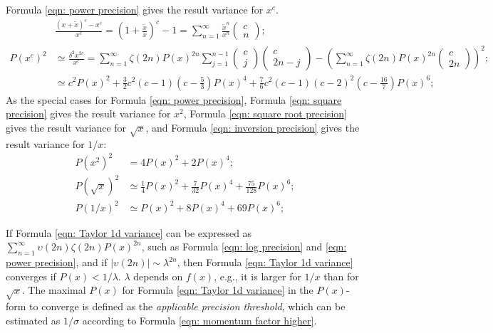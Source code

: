 \documentclass[twoside]{article}
\numberwithin{equation}{section}
\begin{document}
Formula \eqref{eqn: power precision} gives the result variance for $x^c$.
\begin{align}
\label{eqn: power Taylor}
&\frac{(x + \tilde{x})^c - x^c}{x^c} = (1 + \frac{\tilde{x}}{x})^c - 1 = \sum_{n=1}^{\infty} \frac{\tilde{x}^n}{x^n} \begin{pmatrix} c \\ n \end{pmatrix}; \\
\label{eqn: power precision}
P(x^c)^2 &\simeq \frac{\delta^2 x^{2c}}{x^c} = \sum_{n=1}^{\infty} \zeta(2n) P(x)^{2n} \sum_{j=1}^{n-1} \begin{pmatrix} c \\ j \end{pmatrix} \begin{pmatrix} c \\ 2n - j \end{pmatrix}
 - \left( \sum_{n=1}^{\infty} \zeta(2n) P(x)^{2n} \begin{pmatrix} c \\ 2n \end{pmatrix} \right)^2; \\
 &\simeq c^2 P(x)^2 + \frac{3}{2} c^2 (c-1) (c - \frac{5}{3}) P(x)^4 + \frac{7}{6} c^2 (c-1) (c-2)^2 (c - \frac{16}{7}) P(x)^6;
\end{align}
As the special cases for Formula \eqref{eqn: power precision}, Formula \eqref{eqn: square precision} gives the result variance for $x^2$, Formula \eqref{eqn: square root precision} gives the result variance for $\sqrt{x}$, and Formula \eqref{eqn: inversion precision} gives the result variance for $1/x$: 
\begin{align}
\label{eqn: square precision}
P(x^2)^2 &= 4 P(x)^2 + 2 P(x)^4; \\
\label{eqn: square root precision}
P(\sqrt{x})^2 &\simeq \frac{1}{4} P(x)^2 + \frac{7}{32} P(x)^4 + \frac{75}{128} P(x)^6; \\
\label{eqn: inversion precision}
P(1/x)^2 &\simeq P(x)^2 + 8 P(x)^4 + 69 P(x)^6; 
\end{align}

If Formula \eqref{eqn: Taylor 1d variance} can be expressed as $\sum_{n=1}^{\infty} \upsilon(2n) \zeta(2n) P(x)^{2n}$, such as Formula \eqref{eqn: log precision} and \eqref{eqn: power precision}, and if $|\upsilon(2n)| \sim \lambda^{2n}$, then Formula \eqref{eqn: Taylor 1d variance} converges if $P(x) < 1/\lambda$.
$\lambda$ depends on $f(x)$, e.g., it is larger for $1/x$ than for $\sqrt{x}$.
The maximal $P(x)$ for Formula \eqref{eqn: Taylor 1d variance} in the $P(x)$-form to converge is defined as the \emph{applicable precision threshold}, which can be estimated as $1/\sigma$ according to Formula \eqref{eqn: momentum factor higher}.
\end{document}
